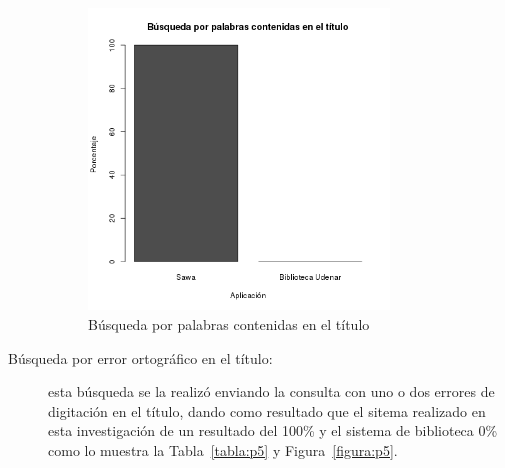 \begin{description}
  \begin{figure}[!ht]
\begin{center}
\includegraphics[width=8cm]{pictures/p4.png}
\end{center}
\caption{Búsqueda por palabras contenidas en el título} \label{figura:p4}
\end{figure}
 
 \newpage
 \item [Búsqueda por error ortográfico en el título:] esta búsqueda se la realizó enviando la consulta
 con uno o dos errores de digitación en el título, dando como resultado que el sitema realizado
 en esta investigación de un resultado del 100\% y el sistema de biblioteca 0\% como lo muestra la Tabla~\ref{tabla:p5} y Figura~\ref{figura:p5}.
 

\end{description}
